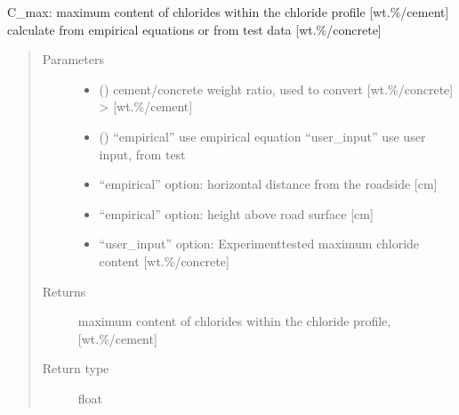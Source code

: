 \documentclass[letterpaper,10pt,english]{sphinxmanual}
\begin{document}
\begin{fulllineitems}
\label{\detokenize{chloride:chloride.C_max}}
\sphinxAtStartPar
C\_max: maximum content of chlorides within the chloride profile {[}wt.\sphinxhyphen{}\%/cement{]}
calculate from empirical equations or from test data {[}wt.\sphinxhyphen{}\%/concrete{]}
\begin{quote}\begin{description}
\item[{Parameters}] \leavevmode\begin{itemize}
\item {} 
\sphinxAtStartPar
{} () \textendash{} cement/concrete weight ratio, used to convert {[}wt.\sphinxhyphen{}\%/concrete{]} \sphinxhyphen{}\textgreater{} {[}wt.\sphinxhyphen{}\%/cement{]}

\item {} 
\sphinxAtStartPar
{} () \textendash{} “empirical” \sphinxhyphen{} use empirical equation
“user\_input” \sphinxhyphen{} use user input, from test

\item {} 
\sphinxAtStartPar
{} \textendash{} “empirical” option: horizontal distance from the roadside {[}cm{]}

\item {} 
\sphinxAtStartPar
{} \textendash{} “empirical” option: height above road surface {[}cm{]}

\item {} 
\sphinxAtStartPar
{} \textendash{} “user\_input” option: Experiment\sphinxhyphen{}tested maximum chloride content {[}wt.\sphinxhyphen{}\%/concrete{]}

\end{itemize}

\item[{Returns}] \leavevmode
\sphinxAtStartPar
{} \textendash{} maximum content of chlorides within the chloride profile, {[}wt.\sphinxhyphen{}\%/cement{]}

\item[{Return type}] \leavevmode
\sphinxAtStartPar
float


\end{description}
\end{quote}
\end{fulllineitems}
\end{document}
